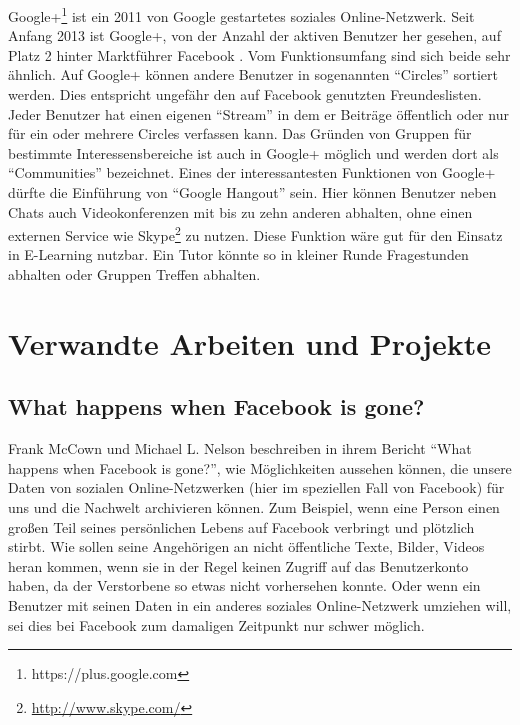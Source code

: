 Google+\footnote{https://plus.google.com} ist ein 2011 von Google gestartetes soziales Online-Netzwerk. Seit Anfang 2013 ist Google+, von der Anzahl der aktiven Benutzer her gesehen, auf Platz 2 hinter Marktführer Facebook \cite{Thomas2013}. Vom Funktionsumfang sind sich beide sehr ähnlich. Auf Google+ können andere Benutzer in sogenannten \enquote{Circles} sortiert werden. Dies entspricht ungefähr den auf Facebook genutzten Freundeslisten. Jeder Benutzer hat einen eigenen \enquote{Stream} in dem er Beiträge öffentlich oder nur für ein oder mehrere Circles verfassen kann. Das Gründen von Gruppen für bestimmte Interessensbereiche ist auch in Google+ möglich und werden dort als \enquote{Communities} bezeichnet. Eines der interessantesten Funktionen von Google+ dürfte die Einführung von \enquote{Google Hangout} sein. Hier können Benutzer neben Chats auch Videokonferenzen mit bis zu zehn anderen abhalten, ohne einen externen Service wie Skype\footnote{\url{http://www.skype.com/}} zu nutzen. Diese Funktion wäre gut für den Einsatz in E-Learning nutzbar. Ein Tutor könnte so in kleiner Runde Fragestunden abhalten oder Gruppen Treffen abhalten.



\section{Verwandte Arbeiten und Projekte} %
\label{sec:verwandte_arbeiten_und_projekte}


\subsection{What happens when Facebook is gone?} %
\label{sub:what_happens_when_facebook_is_gone}

Frank McCown und Michael L. Nelson beschreiben in ihrem Bericht \enquote{What happens when Facebook is gone?}\cite{McCown2009}, wie Möglichkeiten aussehen können, die unsere Daten von sozialen Online-Netzwerken (hier im speziellen Fall von Facebook) für uns und die Nachwelt archivieren können. Zum Beispiel, wenn eine Person einen großen Teil seines persönlichen Lebens auf Facebook verbringt und plötzlich stirbt. Wie sollen seine Angehörigen an nicht öffentliche Texte, Bilder, Videos heran kommen, wenn sie in der Regel keinen Zugriff auf das Benutzerkonto haben, da der Verstorbene so etwas nicht vorhersehen konnte. Oder wenn ein Benutzer mit seinen Daten in ein anderes soziales Online-Netzwerk umziehen will, sei dies bei Facebook zum damaligen Zeitpunkt nur schwer möglich.

